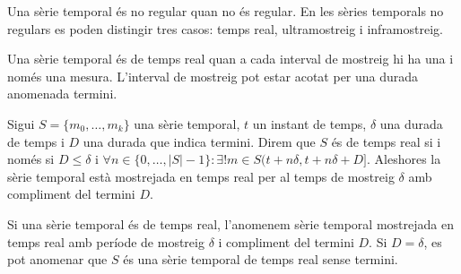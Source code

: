 Una sèrie temporal és no regular quan no és regular. 
En les sèries temporals no regulars es poden distingir tres casos: temps real, ultramostreig i inframostreig.

Una sèrie temporal és de temps real quan a cada interval de mostreig hi ha una i només una mesura. L'interval de mostreig pot estar acotat per una durada anomenada termini.

\begin{definition}\label{def:st:tempsreal}
  Sigui $S=\{m_0,\dotsc,m_k\}$ una sèrie temporal, $t$ un instant de
  temps, $\delta$ una durada de temps i $D$ una durada que indica
  termini. Direm que $S$ és de temps real si i només si $D\leq\delta$
  i $\forall n\in\{0,\ldots,|S|-1\}: \exists!m \in
  S(t+n\delta,t+n\delta+D]$.  Aleshores la sèrie temporal està
  mostrejada en temps real per al temps de mostreig $\delta$ amb
  compliment del termini $D$.
\end{definition}

Si una sèrie temporal és de temps real, l'anomenem  sèrie temporal mostrejada
en temps real amb període de mostreig $\delta$ i compliment del termini $D$.
Si $D=\delta$, es pot anomenar que $S$ és una sèrie temporal de temps real sense termini.





















